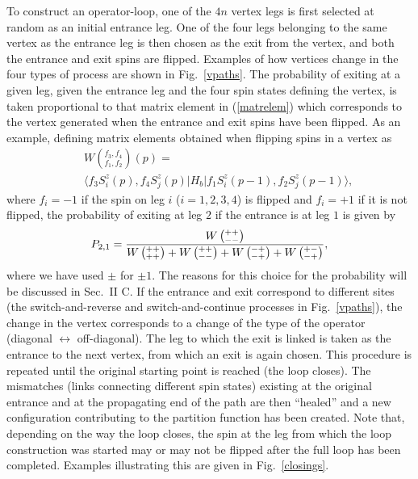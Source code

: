 \documentclass[10pt,pre,aps,twocolumn,showpacs,superscriptaddress,
floatfix]{revtex4}
\begin{document}
To construct an operator-loop, one of the $4n$ vertex legs is first selected 
at random as an initial entrance leg. One of the four legs belonging to the
same vertex as the entrance leg is then chosen as the exit from the vertex, 
and both the entrance and exit spins are flipped. Examples of how vertices 
change in the four types of process are shown in Fig.~\ref{vpaths}. The 
probability of exiting at a given leg, given the entrance leg and the four 
spin states defining the vertex, is taken proportional to that matrix element 
in (\ref{matrelem}) which corresponds to the vertex generated when the 
entrance and exit spins have been flipped. As an example, defining matrix 
elements obtained when flipping spins in a vertex as 
\begin{eqnarray}
& & W \left (_{f_1,f_2}^{f_3,f_4} \right ) (p) = \label{flipvtx} \\
& & \langle f_3S^z_i(p),f_4S^z_j(p)|H_{b}|f_1S^z_i(p-1),f_2S^z_j(p-1)\rangle,
\nonumber
\end{eqnarray}
where $f_i=-1$ if the spin on leg $i$ ($i=1,2,3,4$) is flipped and
$f_i=+1$ if it is not flipped, the probability of exiting at leg $2$ if
the entrance is at leg $1$ is given by
\begin{equation}
P_{2,1} = {W\left(_{--}^{++}\right ) \over
W\left(_{++}^{++} \right ) + 
W\left(_{--}^{++} \right ) +
W\left(_{-+}^{-+} \right ) +
W\left(_{-+}^{+-} \right) },
\label{exitprob}
\end{equation}
where we have used $\pm$ for $\pm 1$.
The reasons for this choice for the probability will be discussed in 
Sec.~II C. If the entrance and exit correspond to different 
sites (the switch-and-reverse and switch-and-continue processes in
Fig.~\ref{vpaths}), the change in the vertex corresponds to a change of the 
type of the operator (diagonal $\leftrightarrow$ off-diagonal). The leg to 
which the exit is linked is taken as the  entrance to the next vertex, from 
which an exit is again chosen. This procedure is repeated until the original 
starting point is reached (the loop closes). The mismatches (links connecting 
different spin states) existing at the original entrance and at the 
propagating end of the path are then ``healed'' and a new configuration 
contributing to the partition function has been created. Note that, depending 
on the way the loop closes, the spin at the leg from which the loop 
construction was started may or may not be flipped after the full loop has 
been completed. Examples illustrating this are given in Fig.~\ref{closings}. 
\end{document}
